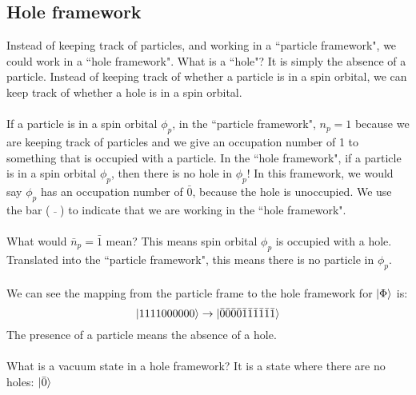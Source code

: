 \documentclass{article}
\newcommand{\kphi}{\ensuremath{\ket{\Phi}} }
\begin{document}
\subsection{Hole framework}
Instead of keeping track of particles, and working in a ``particle framework", we could work in a ``hole framework". 
What is a ``hole"? It is simply the absence of a particle. 
Instead of keeping track of whether a particle is in a spin orbital, we can keep track of whether a hole is in a spin orbital. 
\\ \\
If a particle is in a spin orbital $\phi_p$, in the  ``particle framework", $n_p = 1$ because we are keeping track of particles and we give an occupation number of 1 to 
something that is occupied with a particle.
In the ``hole framework", if a particle is in a spin orbital $\phi_p$, then there is no hole in $\phi_p$! 
In this framework, we would say $\phi_p$ has an occupation number of $\bar{0}$, because the hole is unoccupied. 
We use the bar ( $\bar{\,}$ ) to indicate that we are working in the ``hole framework". 
\\ \\
What would $\bar{n}_p = \bar{1}$ mean?
This means spin orbital $\phi_p$ is occupied with a hole.
Translated into the ``particle framework", this means there is no particle in $\phi_p$.  
\\ \\ 
We can see the mapping from the particle frame to the hole framework for \kphi is: 
\[ \ket{1111000000} \rightarrow  \ket{\bar{0}\bar{0}\bar{0}\bar{0}\bar{1}\bar{1}\bar{1}\bar{1}\bar{1}\bar{1}} \]
The presence of a particle means the absence of a hole. 
\\ \\
What is a vacuum state in a hole framework? 
It is a state where there are no holes: $\ket{\bar{0}}$
\end{document}

